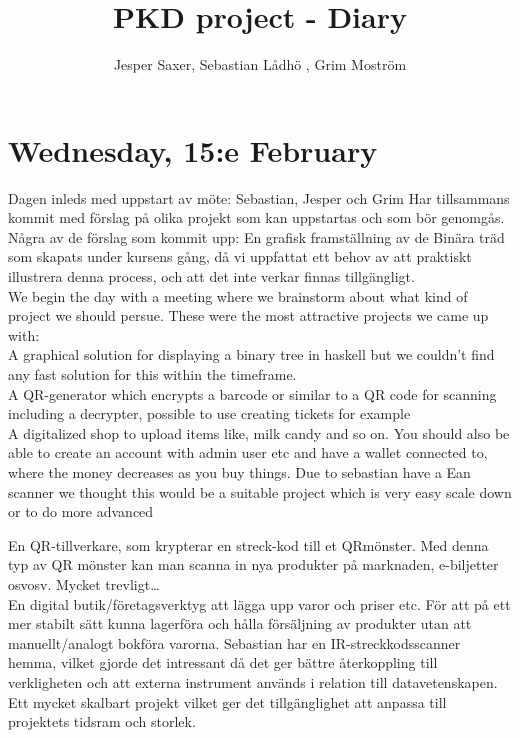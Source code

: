 \documentclass[11pt]{article}
\begin{document}
\title{PKD project - Diary}
\author{Jesper Saxer, Sebastian Lådhö , Grim Moström}
\date{}
\maketitle
\section*{Wednesday, 15:e February}
Dagen inleds med uppstart av möte: Sebastian, Jesper och Grim Har tillsammans kommit med förslag på olika projekt som kan uppstartas och som bör genomgås.
Några av de förslag som kommit upp:
En grafisk framställning av de Binära träd som skapats under kursens gång, då vi uppfattat ett behov av att praktiskt illustrera denna process, och att det inte verkar finnas tillgängligt.\\

We begin the day with a meeting where we brainstorm about what kind of project we should persue. These were the most attractive projects we came up with:\\
A graphical solution for displaying a binary tree in haskell but we couldn't find any fast solution for this within the timeframe.\\
A QR-generator which encrypts a barcode or similar to a QR code for scanning including a decrypter, possible to use creating tickets for example \\
A digitalized shop to upload items like, milk candy and so on. You should also be able to create an account with admin user etc and have a wallet connected to, where the money decreases as you buy things. Due to sebastian have a Ean scanner we thought this would be a suitable project which is very easy scale down or to do more advanced

En QR-tillverkare, som krypterar en streck-kod till et QRmönster. Med denna typ av QR mönster kan man scanna in nya produkter på marknaden, e-biljetter osvosv. Mycket trevligt…\\

En digital butik/företagsverktyg att lägga upp varor och priser etc. För att på ett mer stabilt sätt kunna lagerföra och hålla försäljning av produkter utan att manuellt/analogt bokföra varorna. Sebastian har en IR-streckkodsscanner hemma, vilket gjorde det intressant då det ger bättre återkoppling till verkligheten och att externa instrument används i relation till datavetenskapen. Ett mycket skalbart projekt vilket ger det tillgänglighet att anpassa till projektets tidsram och storlek.\\
\end{document}
